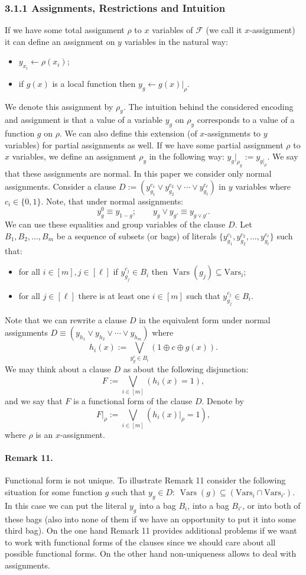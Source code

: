 \subsubsection*{3.1.1 Assignments, Restrictions and Intuition}
If we have some total assignment $\rho$ to $x$ variables of $\mathcal F$ (we call it $x$-assignment) it can define an assignment on $y$ variables in the natural way:
\begin{itemize}
\item $y_{x_i}\leftarrow\rho(x_i)$;
\item if $g(x)$ is a local function then $y_g\leftarrow g(x)|_\rho$.
\end{itemize}
We denote this assignment by $\rho_y$. The intuition behind the considered encoding and assignment is that a value of a variable $y_g$ on $\rho_y$ corresponds to a value of a function $g$ on $\rho$.
We can also define this extension (of $x$-assignments to $y$ variables) for partial assignments as well. If we have some partial assignment $\rho$ to $x$ variables, we define an assignment $\rho_y$ in the following way: $y_g|_{\rho_y}:=y_{g|_\rho}$. We say that these assignments are normal. In this paper we consider only normal assignments.
Consider a clause $D:=(y_{g_1}^{c_1}\vee y_{g_2}^{c_2}\vee\cdots\vee y_{g_\ell}^{c_\ell})$ in $y$ variables where $c_i\in\{0,1\}$. Note, that under normal assignments:
\[y_g^0\equiv y_{1-g};\qquad y_g\vee y_{g'}\equiv y_{g\vee g'}.\]
We can use these equalities and group variables of the clause $D$. Let $B_1,B_2,\ldots,B_m$ be a sequence of subsets (or bags) of literals $\{y_{g_1}^{c_1},y_{g_2}^{c_2},\ldots,y_{g_\ell}^{c_\ell}\}$ such that:
\begin{itemize}
\item for all $i\in[m],j\in[\ell]$ if $y_{g_j}^{c_j}\in B_i$ then $\operatorname{Vars}(g_j)\subseteq\mathrm{Vars}_i$;
\item for all $j\in[\ell]$ there is at least one $i\in[m]$ such that $y_{g_j}^{c_j}\in B_i$.
\end{itemize}
Note that we can rewrite a clause $D$ in the equivalent form under normal assignments $D\equiv(y_{h_1}\vee y_{h_2}\vee\cdots\vee y_{h_m})$ where
\[h_i(x):=\bigvee_{y_g^c\in B_i}(1\oplus c\oplus g(x)).\]
We may think about a clause $D$ as about the following disjunction:
\[F:=\bigvee_{i\in[m]}(h_i(x)=1),\]
and we say that $F$ is a functional form of the clause $D$. Denote by
\[F|_\rho:=\bigvee_{i\in[m]}(h_i(x)|_\rho=1),\]
where $\rho$ is an $x$-assignment.
\paragraph{Remark 11.} Functional form is not unique.
To illustrate Remark 11 consider the following situation for some function $g$ such that $y_g\in D$: $\operatorname{Vars}(g)\subseteq(\mathrm{Vars}_i\cap\mathrm{Vars}_{i'})$. In this case we can put the literal $y_g$ into a bag $B_i$, into a bag $B_{i'}$, or into both of these bags (also into none of them if we have an opportunity to put it into some third bag).
On the one hand Remark 11 provides additional problems if we want to work with functional forms of the clauses since we should care about all possible functional forms. On the other hand non-uniqueness allows to deal with assignments.
